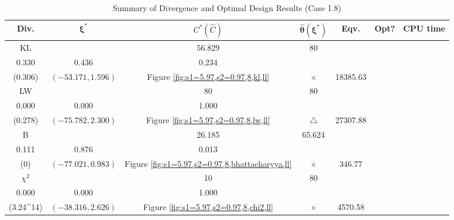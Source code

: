 \documentclass[12pt, a4paper]{article}
\begin{document}
\begin{table}[H]
\centering
\renewcommand{\arraystretch}{1.5} %
\setlength{\tabcolsep}{8pt} %
\begin{tabular}{|c|c|c|c|c|c|c|}
\hline
\textbf{Div.} & \(\boldsymbol{\xi^*}\) & \(C^* (\hat{C})\) & \(\boldsymbol{\hat{\theta}(\xi^*)}\) & \textbf{Eqv.} & \textbf{Opt?} & \textbf{CPU time} \\
\hline
KL & \(\left\{\begin{array}{ccc}
33.554 & 56.829 & 80 \\
0.330 & 0.436 & 0.234
\end{array}\right\}\) &
\(\begin{array}{c}
0.00927 \\
(0.306)
\end{array}\) & 
\((-53.171, 1.596)\) & 
Figure \ref{fig:s1=5.97,s2=0.97,8,kl,ll} & $\times$ & 18385.63 \\
\hline
LW & \(\left\{\begin{array}{ccc}
80 & 80 & 80 \\
0.000 & 0.000 & 1.000
\end{array}\right\}\) &
\(\begin{array}{c}
0.502 \\
(0.278)
\end{array}\) & 
\((-75.782, 2.300)\) & 
Figure \ref{fig:s1=5.97,s2=0.97,8,lw,ll} & $\triangle$ & 27307.88 \\
\hline
B & \(\left\{\begin{array}{ccc}
20.8 & 26.185 & 65.624 \\
0.111 & 0.876 & 0.013
\end{array}\right\}\) &
\(\begin{array}{c}
0 \\
(0)
\end{array}\) & 
\((-77.021, 0.983)\) & 
Figure \ref{fig:s1=5.97,s2=0.97,8,bhattacharyya,ll} & $\times$ & 346.77 \\
\hline
\(\chi^2\) & \(\left\{\begin{array}{ccc}
10 & 10 & 80 \\
0.000 & 0.000 & 1.000
\end{array}\right\}\) &
\(\begin{array}{c}
3.24\times 10^{14} \\
(3.24\times 10^{14})
\end{array}\) & 
\((-38.316, 2.626)\) & 
Figure \ref{fig:s1=5.97,s2=0.97,8,chi2,ll} & $\times$ & 4570.58 \\
\hline
\end{tabular}
\caption{Summary of Divergence and Optimal Design Results (Case 1.8)}
\label{tab:results1.8}
\end{table}
\end{document}
